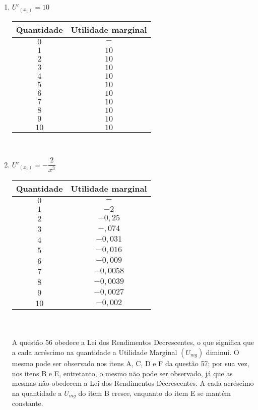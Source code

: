 \documentclass[a4paper, 12pt]{article}
\begin{document}
\begin{enumerate}
\begin{enumerate}
		\item $U'_{(x_1)} = 10$\\
		\begin{table}[H]
			\begin{tabular}{|c|c|}
				\hline
				Quantidade & Utilidade marginal \\ \hline
				$0$ & $-$\\ \hline
				$1$ & $10$\\ \hline
				$2$ & $10$\\ \hline
				$3$ & $10$\\ \hline
				$4$ & $10$\\ \hline
				$5$ & $10$\\ \hline
				$6$ & $10$\\ \hline
				$7$ & $10$\\ \hline
				$8$ & $10$\\ \hline
				$9$ & $10$\\ \hline
				$10$ & $10$\\ \hline
			\end{tabular}
		\end{table}\\
	
		\item $U'_{(x_1)} = - \dfrac{2}{x^3}$\\
		\begin{table}[H]
			\begin{tabular}{|c|c|}
				\hline
				Quantidade & Utilidade marginal \\ \hline
				$0$ & $-$\\ \hline
				$1$ & $-2$\\ \hline
				$2$ & $-0,25$\\ \hline
				$3$ & $-,074$\\ \hline
				$4$ & $-0,031$\\ \hline
				$5$ & $-0,016$\\ \hline
				$6$ & $-0,009$\\ \hline
				$7$ & $-0,0058$\\ \hline
				$8$ & $-0,0039$\\ \hline
				$9$ & $-0,0027$\\ \hline
				$10$ & $-0,002$\\ \hline
			\end{tabular}
		\end{table}\\
		\paragraph{}A questão 56 obedece a Lei dos Rendimentos Decrescentes, o que significa que a cada acréscimo na quantidade a Utilidade Marginal $(U_{mg})$ diminui. O mesmo pode ser observado nos itens A, C, D e F da questão 57; por sua vez, nos itens B e E, entretanto, o mesmo não pode ser observado, já que as mesmas não obedecem a Lei dos Rendimentos Decrescentes. A cada acréscimo na quantidade a $U_{mg}$ do item B cresce, enquanto do item E se mantém constante.\\
	\end{enumerate}
	\\


\end{enumerate}
\end{document}

